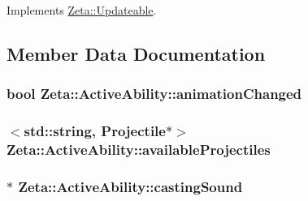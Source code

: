 Implements \hyperlink{classZeta_1_1Updateable_af4006bfccb762454b4da08786ad93de0}{Zeta\+::\+Updateable}.



\subsection{Member Data Documentation}
\hypertarget{classZeta_1_1ActiveAbility_a2f677d94741cf5893ae1b1b9e04c1eb9}{
\subsubsection[{animation\+Changed}]{\setlength{\rightskip}{0pt plus 5cm}bool Zeta\+::\+Active\+Ability\+::animation\+Changed\hspace{0.3cm}{\ttfamily [protected]}}}\label{classZeta_1_1ActiveAbility_a2f677d94741cf5893ae1b1b9e04c1eb9}
\hypertarget{classZeta_1_1ActiveAbility_a5f3cc050a91d4426eff5b876bd3b5cd0}{
\subsubsection[{available\+Projectiles}]{$<$std\+::string, {\bf Projectile}$\ast$$>$ Zeta\+::\+Active\+Ability\+::available\+Projectiles\hspace{0.3cm}{\ttfamily [protected]}}}\label{classZeta_1_1ActiveAbility_a5f3cc050a91d4426eff5b876bd3b5cd0}
\hypertarget{classZeta_1_1ActiveAbility_a5383a436ae261b80675f20034816a22f}{
\subsubsection[{casting\+Sound}]{$\ast$ Zeta\+::\+Active\+Ability\+::casting\+Sound\hspace{0.3cm}{\ttfamily [protected]}}}\label{classZeta_1_1ActiveAbility_a5383a436ae261b80675f20034816a22f}

